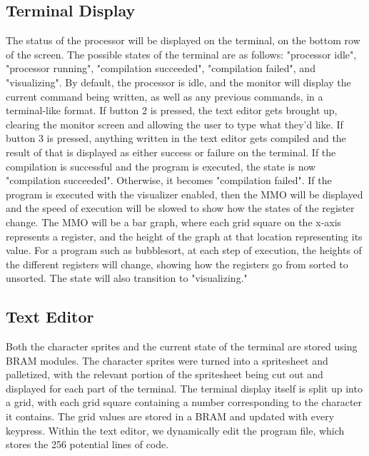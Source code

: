 \documentclass[conference]{IEEEtran}
\begin{document}
\subsection{Terminal Display}
The status of the processor will be displayed on the terminal, on the bottom row of the screen. The possible states of the terminal are as follows: "processor idle", "processor running", "compilation succeeded", "compilation failed", and "visualizing".
\newline\newline
By default, the processor is idle, and the monitor will display the current command being written, as well as any previous commands, in a terminal-like format. If button 2 is pressed, the text editor gets brought up, clearing the monitor screen and allowing the user to type what they'd like.
\newline\newline
If button 3 is pressed, anything written in the text editor gets compiled and the result of that is displayed as either success or failure on the terminal. If the compilation is successful and the program is executed, the state is now "compilation succeeded". Otherwise, it becomes "compilation failed".
\newline\newline
If the program is executed with the visualizer enabled, then the MMO will be displayed and the speed of execution will be slowed to show how the states of the register change. The MMO will be a bar graph, where each grid square on the x-axis represents a register, and the height of the graph at that location representing its value. For a program such as bubblesort, at each step of execution, the heights of the different registers will change, showing how the registers go from sorted to unsorted. The state will also transition to "visualizing."
\subsection{Text Editor}


Both the character sprites and the current state of the terminal are stored using BRAM modules. The character sprites were turned into a spritesheet and palletized, with the relevant portion of the spritesheet being cut out and displayed for each part of the terminal. The terminal display itself is split up into a grid, with each grid square containing a number corresponding to the character it contains. The grid values are stored in a BRAM and updated with every keypress.
Within the text editor, we dynamically edit the program file, which stores the 256 potential lines of code.
\end{document}
